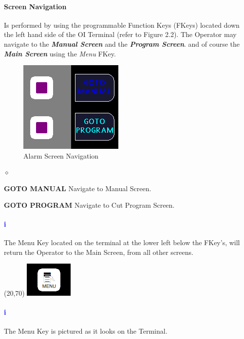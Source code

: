 \paragraph*{Screen Navigation}Is performed by using the programmable Function Keys (FKeys) located down the left hand side of the OI Terminal (refer to Figure 2.2). The Operator may navigate to the \textbf{\textit{Manual Screen}} and the \textbf{\textit{Program Screen}}. and of course the \textbf{\textit{Main Screen}} using the \textit{Menu} FKey.
\begin{figure}
	\centering
	\includegraphics[width=.3\linewidth]{screen-captures/alarms-nav}
	\caption{Alarm Screen Navigation}
	\label{fig:alarm-nav}
\end{figure}
\begin{list}{$\diamond$}{}
	\item \textbf{GOTO MANUAL} Navigate to Manual Screen.
	\item \textbf{GOTO PROGRAM} Navigate to Cut Program Screen.
\end{list}

\paragraph*{\textbf{\LARGE \textcolor{blue}{i}}}
The Menu Key located on the terminal at the lower left below the FKey's, will return the Operator to the Main Screen, from all other screens.\\
\begin{minipage}{4cm}
	\begin{picture}(20,70)
	\includegraphics[width=.5\linewidth]{screen-captures/menu}
	\end{picture}
\end{minipage}\begin{minipage}[]{11cm}
\paragraph{\textbf{\LARGE \textcolor{blue}{i}}} The Menu Key is pictured as it looks on the Terminal.
\end{minipage}
\pagebreak
